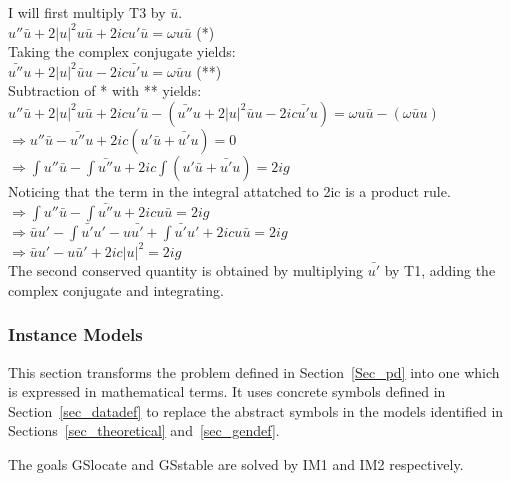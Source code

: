 \documentclass[12pt]{article}
\begin{document}
I will first multiply T3 by $\bar{u}$. \\ 
$  u''\bar{u} + 2|u|^{2}u \bar{u}+2icu' \bar{u}=\omega u \bar{u}$ (*) \\ 
Taking the complex conjugate yields: \\ 
$ \bar{u''} u + 2|u|^{2} \bar{u} u -2ic\bar{u'}u = \omega \bar{u} u$ (**) \\ 
Subtraction of * with ** yields: \\
$  u''\bar{u} + 2|u|^{2}u \bar{u}+2icu' \bar{u} - (\bar{u''} u + 2|u|^{2} 
\bar{u} u -2ic\bar{u'}u) =\omega u \bar{u} - (\omega \bar{u} u)$\\ 
$ \Rightarrow  u''\bar{u} - \bar{u''} u + 2ic (u' \bar{u} + \bar{u'}u ) = 0$ \\
$ \Rightarrow \int u''\bar{u} - \int \bar{u''} u + 2ic \int (u' \bar{u} + 
\bar{u'}u ) = 2ig  $ \\ 
Noticing that the term in the integral attatched to 2ic is a product rule.\\
$ \Rightarrow \int u''\bar{u} - \int \bar{u''} u + 2icu \bar{u} = 2ig $ \\
$ \Rightarrow \bar{u}u' - \int \bar{u'} u' - u \bar{u'} + \int \bar{u'} u' + 
2icu \bar{u} = 2ig$ \\ 
$ \Rightarrow \bar{u}u' - u\bar{u}' + 2ic|u|^{2} = 2ig$ \\
The second conserved quantity is obtained by multiplying $\bar{u'}$ by T1, 
adding the complex conjugate and integrating. \\ 

\subsubsection{Instance Models} \label{sec_instance}    

This section transforms the problem defined in Section~\ref{Sec_pd} into 
one which is expressed in mathematical terms. It uses concrete symbols defined 
in Section~\ref{sec_datadef} to replace the abstract symbols in the models 
identified in Sections~\ref{sec_theoretical} and~\ref{sec_gendef}.

The goals GSlocate and GSstable are solved by IM1 and IM2 respectively.  

\end{document}
